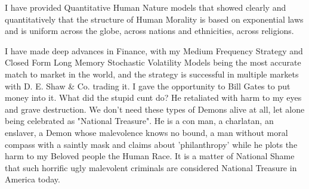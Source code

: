\documentclass{amsart}
\begin{document}
I have provided Quantitative Human Nature models that showed clearly and quantitatively that the structure of Human Morality is based on exponential laws and is uniform across the globe, across nations and ethnicities, across religions.  

I have made deep advances in Finance, with my Medium Frequency Strategy and Closed Form Long Memory Stochastic Volatility Models being the most accurate match to market in the world, and the strategy is successful in multiple markets with D. E. Shaw \& Co. trading it.  I gave the opportunity to Bill Gates to put money into it.  What did the stupid cunt do?  He retaliated with harm to my eyes and grave destruction.  We don't need these types of Demons alive at all, let alone being celebrated as "National Treasure".  He is a con man, a charlatan, an enslaver, a Demon whose malevolence knows no bound, a man without moral compass with a saintly mask and claims about 'philanthropy' while he plots the harm to my Beloved people the Human Race.  It is a matter of National Shame that such horrific ugly malevolent criminals are considered National Treasure in America today.
\end{document}
